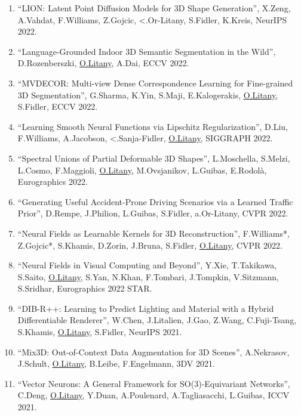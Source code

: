 \begin{enumerate}
\item ``LION: Latent Point Diffusion Models for 3D Shape Generation'', X.Zeng, A.Vahdat, F.Williams, Z.Gojcic, <.Or-Litany, S.Fidler, K.Kreis, NeurIPS 2022.

\item ``Language-Grounded Indoor 3D Semantic Segmentation in the Wild'', D.Rozenberszki, \underline{O.Litany}, A.Dai, ECCV 2022.

\item ``MVDECOR: Multi-view Dense Correspondence Learning for Fine-grained 3D Segmentation'', G.Sharma, K.Yin, S.Maji, E.Kalogerakis, \underline{O.Litany}, S.Fidler, ECCV 2022.

\item ``Learning Smooth Neural Functions via Lipschitz Regularization'', D.Liu, F.Williams, A.Jacobson, <.Sanja-Fidler, \underline{O.Litany}, SIGGRAPH 2022.

\item ``Spectral Unions of Partial Deformable 3D Shapes'', L.Moschella, S.Melzi, L.Cosmo, F.Maggioli, \underline{O.Litany}, M.Ovsjanikov, L.Guibas, E.Rodolà, Eurographics 2022.

\item ``Generating Useful Accident-Prone Driving Scenarios via a Learned Traffic Prior'', D.Rempe, J.Philion, L.Guibas, S.Fidler, a.Or-Litany, CVPR 2022.

\item ``Neural Fields as Learnable Kernels for 3D Reconstruction'', F.Williams*, Z.Gojcic*, S.Khamis, D.Zorin, J.Bruna, S.Fidler, \underline{O.Litany}, CVPR 2022.

\item ``Neural Fields in Visual Computing and Beyond'', Y.Xie, T.Takikawa, S.Saito, \underline{O.Litany}, S.Yan, N.Khan, F.Tombari, J.Tompkin, V.Sitzmann, S.Sridhar, Eurographics 2022 STAR.

\item ``DIB-R++: Learning to Predict Lighting and Material with a Hybrid Differentiable Renderer'', W.Chen, J.Litalien, J.Gao, Z.Wang, C.Fuji-Tsang, S.Khamis, \underline{O.Litany}, S.Fidler, NeurIPS 2021.

\item ``Mix3D: Out-of-Context Data Augmentation for 3D Scenes'', A.Nekrasov, J.Schult, \underline{O.Litany}, B.Leibe, F.Engelmann, 3DV 2021.

\item ``Vector Neurons: A General Framework for SO(3)-Equivariant Networks'', C.Deng, \underline{O.Litany}, Y.Duan, A.Poulenard, A.Tagliasacchi, L.Guibas, ICCV 2021.


\end{enumerate}
